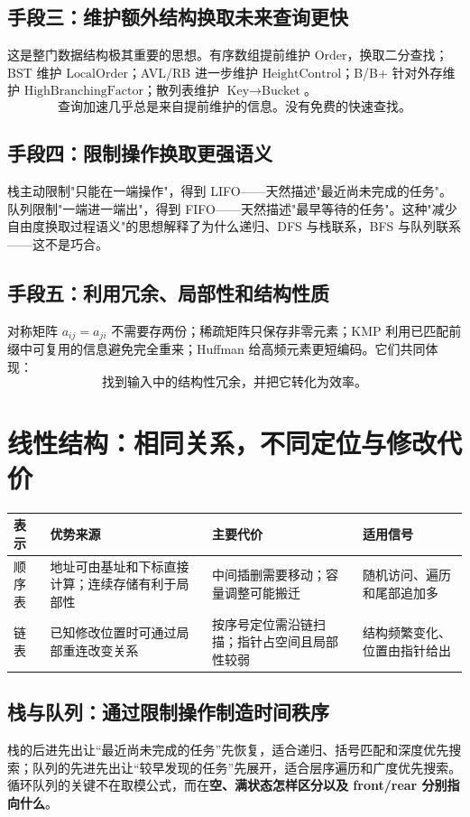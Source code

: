 \documentclass[11pt,a4paper,openany]{ctexbook}
\newcommand{\key}[1]{\textbf{\color{deep}#1}}
\begin{document}
\subsection{手段三：维护额外结构换取未来查询更快}

这是整门数据结构极其重要的思想。有序数组提前维护 $\text{Order}$，换取二分查找；BST 维护 $\text{LocalOrder}$；AVL/RB 进一步维护 $\text{HeightControl}$；B/B+ 针对外存维护 $\text{HighBranchingFactor}$；散列表维护 $\text{Key}\rightarrow\text{Bucket}$。
\[
\boxed{\text{查询加速几乎总是来自提前维护的信息。没有免费的快速查找。}}
\]

\subsection{手段四：限制操作换取更强语义}

栈主动限制"只能在一端操作"，得到 LIFO——天然描述"最近尚未完成的任务"。队列限制"一端进一端出"，得到 FIFO——天然描述"最早等待的任务"。这种"减少自由度换取过程语义"的思想解释了为什么递归、DFS 与栈联系，BFS 与队列联系——这不是巧合。

\subsection{手段五：利用冗余、局部性和结构性质}

对称矩阵 $a_{ij}=a_{ji}$ 不需要存两份；稀疏矩阵只保存非零元素；KMP 利用已匹配前缀中可复用的信息避免完全重来；Huffman 给高频元素更短编码。它们共同体现：
\[
\boxed{\text{找到输入中的结构性冗余，并把它转化为效率。}}
\]

\section{线性结构：相同关系，不同定位与修改代价}

\begin{longtable}{p{2.3cm}p{4.2cm}p{4.2cm}p{\dimexpr\linewidth-12.39cm\relax}}
\toprule
\textbf{表示} & \textbf{优势来源} & \textbf{主要代价} & \textbf{适用信号}\\
\midrule
顺序表 & 地址可由基址和下标直接计算；连续存储有利于局部性 & 中间插删需要移动；容量调整可能搬迁 & 随机访问、遍历和尾部追加多\\
\midrule
链表 & 已知修改位置时可通过局部重连改变关系 & 按序号定位需沿链扫描；指针占空间且局部性较弱 & 结构频繁变化、位置由指针给出\\
\bottomrule
\end{longtable}

\subsection{栈与队列：通过限制操作制造时间秩序}
栈的后进先出让“最近尚未完成的任务”先恢复，适合递归、括号匹配和深度优先搜索；队列的先进先出让“较早发现的任务”先展开，适合层序遍历和广度优先搜索。循环队列的关键不在取模公式，而在\key{空、满状态怎样区分以及 front/rear 分别指向什么}。
\end{document}
